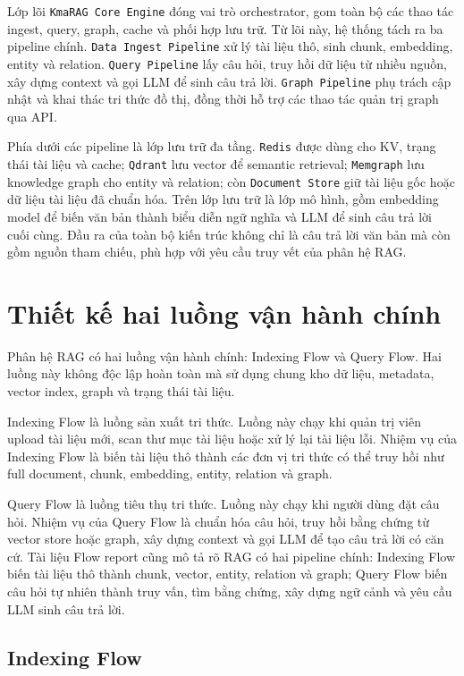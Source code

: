 Lớp lõi \texttt{KmaRAG Core Engine} đóng vai trò orchestrator, gom toàn bộ các thao tác ingest, query, graph, cache và phối hợp lưu trữ. Từ lõi này, hệ thống tách ra ba pipeline chính. \texttt{Data Ingest Pipeline} xử lý tài liệu thô, sinh chunk, embedding, entity và relation. \texttt{Query Pipeline} lấy câu hỏi, truy hồi dữ liệu từ nhiều nguồn, xây dựng context và gọi LLM để sinh câu trả lời. \texttt{Graph Pipeline} phụ trách cập nhật và khai thác tri thức đồ thị, đồng thời hỗ trợ các thao tác quản trị graph qua API.

Phía dưới các pipeline là lớp lưu trữ đa tầng. \texttt{Redis} được dùng cho KV, trạng thái tài liệu và cache; \texttt{Qdrant} lưu vector để semantic retrieval; \texttt{Memgraph} lưu knowledge graph cho entity và relation; còn \texttt{Document Store} giữ tài liệu gốc hoặc dữ liệu tài liệu đã chuẩn hóa. Trên lớp lưu trữ là lớp mô hình, gồm embedding model để biến văn bản thành biểu diễn ngữ nghĩa và LLM để sinh câu trả lời cuối cùng. Đầu ra của toàn bộ kiến trúc không chỉ là câu trả lời văn bản mà còn gồm nguồn tham chiếu, phù hợp với yêu cầu truy vết của phân hệ RAG.

\section{Thiết kế hai luồng vận hành chính}

Phân hệ RAG có hai luồng vận hành chính: Indexing Flow và Query Flow. Hai luồng này không độc lập hoàn toàn mà sử dụng chung kho dữ liệu, metadata, vector index, graph và trạng thái tài liệu.

Indexing Flow là luồng sản xuất tri thức. Luồng này chạy khi quản trị viên upload tài liệu mới, scan thư mục tài liệu hoặc xử lý lại tài liệu lỗi. Nhiệm vụ của Indexing Flow là biến tài liệu thô thành các đơn vị tri thức có thể truy hồi như full document, chunk, embedding, entity, relation và graph.

Query Flow là luồng tiêu thụ tri thức. Luồng này chạy khi người dùng đặt câu hỏi. Nhiệm vụ của Query Flow là chuẩn hóa câu hỏi, truy hồi bằng chứng từ vector store hoặc graph, xây dựng context và gọi LLM để tạo câu trả lời có căn cứ. Tài liệu Flow report cũng mô tả rõ RAG có hai pipeline chính: Indexing Flow biến tài liệu thô thành chunk, vector, entity, relation và graph; Query Flow biến câu hỏi tự nhiên thành truy vấn, tìm bằng chứng, xây dựng ngữ cảnh và yêu cầu LLM sinh câu trả lời.

\subsection{Indexing Flow}


